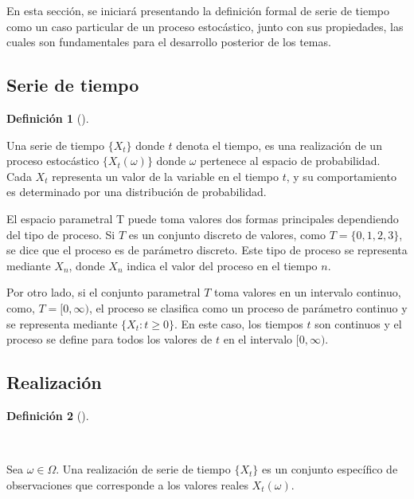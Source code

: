 \documentclass[
  us-letterpaper,
]{scrreprt}
\theoremstyle{plain}
\theoremstyle{definition}
\newtheorem{definition}{Definición}[chapter]
\theoremstyle{definition}
\theoremstyle{remark}
\begin{document}
En esta sección, se iniciará presentando la definición formal de serie
de tiempo como un caso particular de un proceso estocástico, junto con
sus propiedades, las cuales son fundamentales para el desarrollo
posterior de los temas.

\subsection{Serie de tiempo}\label{serie-de-tiempo}

\begin{definition}[]\protect\hypertarget{def-ts}{}\label{def-ts}

Una serie de tiempo \(\{X_t\}\) donde \(t\) denota el tiempo, es una
realización de un proceso estocástico \(\{X_t(\omega)\}\) donde
\(\omega\) pertenece al espacio de probabilidad. Cada \(X_t\) representa
un valor de la variable en el tiempo \(t\), y su comportamiento es
determinado por una distribución de probabilidad.

El espacio parametral T puede toma valores dos formas principales
dependiendo del tipo de proceso. Si \(T\) es un conjunto discreto de
valores, como \(T= \{0,1,2,3 \}\), se dice que el proceso es de
parámetro discreto. Este tipo de proceso se representa mediante \(X_n\),
donde \(X_n\) indica el valor del proceso en el tiempo \(n\).

Por otro lado, si el conjunto parametral \(T\) toma valores en un
intervalo continuo, como, \(T=[0,\infty)\), el proceso se clasifica como
un proceso de parámetro continuo y se representa mediante
\(\{X_t:t \geq 0\}\). En este caso, los tiempos \(t\) son continuos y el
proceso se define para todos los valores de \(t\) en el intervalo
\([0,\infty)\).

\end{definition}

\subsection{Realización}\label{realizaciuxf3n}

\begin{definition}[]\protect\hypertarget{def-realizacion}{}\label{def-realizacion}

~

Sea \(\omega \in \Omega\). Una realización de serie de tiempo
\(\{X_t\}\) es un conjunto específico de observaciones que corresponde a
los valores reales \(X_t(\omega)\).

\end{definition}
\end{document}
